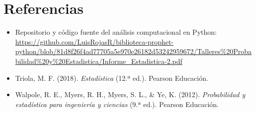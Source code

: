 \documentclass[12pt,letterpaper]{article}
\begin{document}
\section{Referencias}

\begin{itemize}[leftmargin=1.2cm]
    \item Repositorio y código fuente del análisis computacional en Python: \url{https://github.com/LuisRojasR/biblioteca-prophet-python/blob/81d8f26f4ad77705a5e970e26182d53242959672/Talleres\%20Probabilidad\%20y\%20Estadistica/Informe_Estadistica-2.pdf}
    \item Triola, M. F. (2018). \textit{Estadística} (12.ª ed.). Pearson Educación.
    \item Walpole, R. E., Myers, R. H., Myers, S. L., \& Ye, K. (2012). \textit{Probabilidad y estadística para ingeniería y ciencias} (9.ª ed.). Pearson Educación.
\end{itemize}
\end{document}
